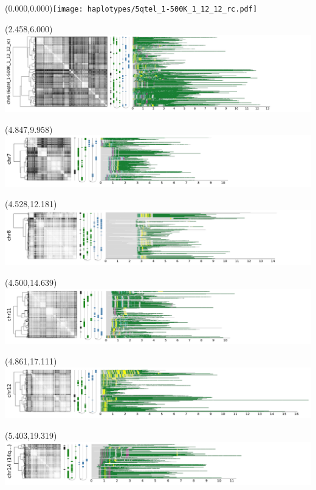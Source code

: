 \documentclass{article}
\begin{document}
\begin{textblock}{13}(0.000,0.000)\texttt{[image: haplotypes/5qtel\_1-500K\_1\_12\_12\_rc.pdf]}\end{textblock}
\begin{textblock}{13}(2.458,6.000)\includegraphics{haplotypes/6qtel_1-500K_1_12_12_rc.pdf}\end{textblock}
\begin{textblock}{13}(4.847,9.958)\includegraphics{haplotypes/chr7.pdf}\end{textblock}
\begin{textblock}{13}(4.528,12.181)\includegraphics{haplotypes/chr8.pdf}\end{textblock}
\begin{textblock}{13}(4.500,14.639)\includegraphics{haplotypes/chr11.pdf}\end{textblock}
\begin{textblock}{13}(4.861,17.111)\includegraphics{haplotypes/chr12.pdf}\end{textblock}
\begin{textblock}{13}(5.403,19.319)\includegraphics{haplotypes/14qtel_1-500K_1_12_12_rc.pdf}\end{textblock}
\end{document}

